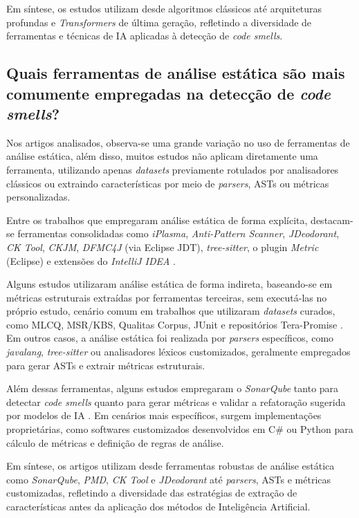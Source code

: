 {Em síntese, os estudos utilizam desde algoritmos clássicos até arquiteturas profundas e 
\textit{Transformers} de última geração, refletindo a diversidade de ferramentas e técnicas de IA aplicadas à 
detecção de \textit{code smells}.


\subsection{Quais ferramentas de análise estática são mais comumente empregadas na detecção de \textit{code smells}?}

Nos artigos analisados, observa-se uma grande variação no uso de ferramentas de análise
estática, além disso, muitos estudos não aplicam diretamente uma ferramenta, utilizando apenas \textit{datasets} previamente rotulados por 
analisadores clássicos ou extraindo características por meio de \textit{parsers}, 
ASTs ou métricas personalizadas. 



Entre os trabalhos que empregaram análise 
estática de forma explícita, destacam-se ferramentas consolidadas como 
\textit{iPlasma}, \textit{Anti-Pattern Scanner}, 
\textit{JDeodorant}, \textit{CK Tool}, \textit{CKJM}, 
\textit{DFMC4J} (via Eclipse JDT), \textit{tree-sitter}, o plugin \textit{Metric} 
(Eclipse) e extensões do \textit{IntelliJ IDEA} \cite{Yadav2024Survey,Moreira2024CIBSE}. 

Alguns estudos utilizaram análise estática de forma indireta, baseando-se em 
métricas estruturais extraídas por ferramentas terceiras, sem executá-las 
no próprio estudo, cenário comum em trabalhos que utilizaram 
\textit{datasets} curados, como MLCQ, MSR/KBS, Qualitas Corpus, JUnit e 
repositórios Tera-Promise \cite{Ho2025EnseSmells,Yahya2023DeepLearningSmells}. Em outros casos, a análise estática foi realizada 
por \textit{parsers} específicos, como \textit{javalang}, \textit{tree-sitter} ou 
analisadores léxicos customizados, geralmente empregados para gerar ASTs 
e extrair métricas estruturais.

Além dessas ferramentas, alguns estudos empregaram o 
\textit{SonarQube} tanto para detectar \textit{code smells} quanto para gerar 
métricas e validar a refatoração sugerida por modelos de IA \cite{Nizam2023DeepLearningSmells}. Em cenários 
mais específicos, surgem implementações proprietárias, como softwares 
customizados desenvolvidos em C\# ou Python para cálculo de métricas e 
definição de regras de análise.

Em síntese, os artigos utilizam desde ferramentas robustas de análise estática 
como \textit{SonarQube}, \textit{PMD}, \textit{CK Tool} e \textit{JDeodorant} 
até \textit{parsers}, ASTs e métricas customizadas, refletindo a diversidade 
das estratégias de extração de características antes da aplicação dos métodos 
de Inteligência Artificial.

}
